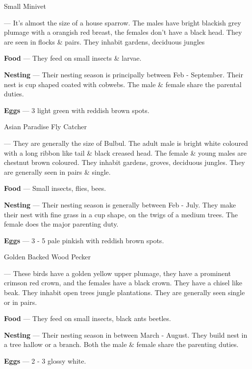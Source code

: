 \begin{bird}{Small Minivet}

 --- It's almost the size of a house sparrow. The males have bright blackish grey plumage with a orangish red breast, the females don't have a black head. They are seen in flocks \& pairs. They inhabit gardens, deciduous jungles

{\large\bf Food} --- They feed on small insects \& larvae.

{\large\bf Nesting} --- Their nesting season is principally between Feb - September. Their nest is cup shaped coated with cobwebs. The male \& female share the parental duties.

{\large\bf Eggs} --- 3 light green with reddish brown spots.
\end{bird}

\newpage

\begin{bird}{Asian Paradise Fly Catcher}

 --- They are generally the size of Bulbul. The adult male is bright white coloured with a long ribbon like tail \& black creased head. The female \& young males are chestnut brown coloured. They inhabit gardens, groves, deciduous jungles. They are generally seen in pairs \& single. 

{\large\bf Food} --- Small insects, flies, bees.

{\large\bf Nesting} --- Their nesting season is generally between Feb - July. They make their nest with fine grass in a cup shape, on the twigs of a medium trees. The female does the major parenting duty.

{\large\bf Eggs} --- 3 - 5 pale pinkish with reddish brown spots. 
\end{bird}

\begin{bird}{Golden Backed Wood Pecker}

 --- These birds have a golden yellow upper plumage, they have a prominent crimson red crown, and the females have a black crown. They have a chisel like beak. They inhabit open trees jungle plantations. They are generally seen single or in pairs.

{\large\bf Food} --- They feed on small insects, black ants beetles.

{\large\bf Nesting} --- Their nesting season in between March - August. They build nest in a tree hallow or a branch. Both the male \& female share the parenting duties.

{\large\bf Eggs} --- 2 - 3 glossy white.
\end{bird}

